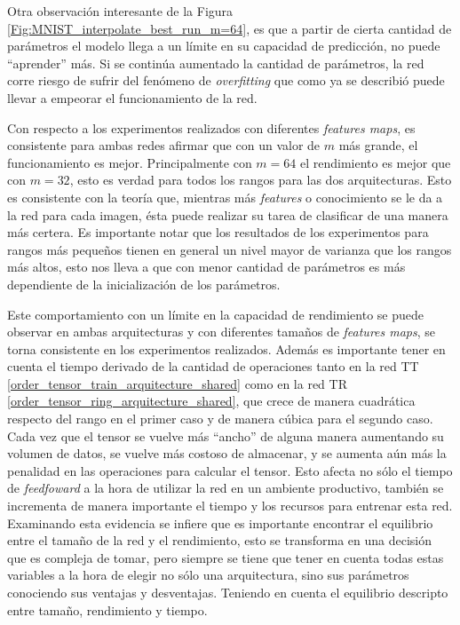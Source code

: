 \documentclass[spanish]{article}
\theoremstyle{definition}
\theoremstyle{remark}
\numberwithin{equation}{section}
\numberwithin{equation}{section} %
\begin{document}
\par
Otra observación interesante de la Figura \ref{Fig:MNIST_interpolate_best_run_m=64}, es que a partir de cierta cantidad de parámetros el modelo llega a un límite en su capacidad de predicción, no puede ``aprender'' más. Si se continúa aumentado la cantidad de parámetros, la red corre riesgo de sufrir del fenómeno de \textit{overfitting} que como ya se describió puede llevar a empeorar el funcionamiento de la red.  
\par
Con respecto a los experimentos realizados con diferentes \textit{features maps}, es consistente para ambas redes afirmar que con un valor de $m$ más grande, el funcionamiento es mejor. Principalmente con $m=64$ el rendimiento es mejor que con $m=32$, esto es verdad para todos los rangos para las dos arquitecturas. Esto es consistente con la teoría que, mientras más \textit{features} o conocimiento se le da a la red para cada imagen, ésta puede realizar su tarea de clasificar de una manera más certera. Es importante notar que los resultados de los experimentos para rangos más pequeños tienen en general un nivel mayor de varianza que los rangos más altos, esto nos lleva a que con menor cantidad de parámetros es más dependiente de la inicialización de los parámetros.    
\par
Este comportamiento con un límite en la capacidad de rendimiento se puede observar en ambas arquitecturas y con diferentes tamaños de \textit{features maps}, se torna consistente en los experimentos realizados. Además es importante tener en cuenta el tiempo derivado de la cantidad de operaciones tanto en la red TT \eqref{order_tensor_train_arquitecture_shared} como en la red TR \eqref{order_tensor_ring_arquitecture_shared}, que crece de manera cuadrática respecto del rango en el primer caso y de manera cúbica para el segundo caso. Cada vez que el tensor se vuelve más ``ancho'' de alguna manera aumentando su volumen de datos, se vuelve más costoso de almacenar, y se aumenta aún más la penalidad en las operaciones para calcular el tensor. Esto afecta no sólo el tiempo de \textit{feedfoward} a la hora de utilizar la red en un ambiente productivo, también se incrementa de manera importante el tiempo y los recursos para entrenar esta red. Examinando esta evidencia se infiere que es importante encontrar el equilibrio entre el tamaño de la red y el rendimiento, esto se transforma en una decisión que es compleja de tomar, pero siempre se tiene que tener en cuenta todas estas variables a la hora de elegir no sólo una arquitectura, sino sus parámetros conociendo sus ventajas y desventajas. Teniendo en cuenta el equilibrio descripto entre tamaño, rendimiento y tiempo.    
\end{document}
